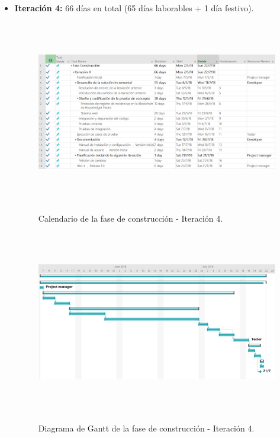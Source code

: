 \documentclass[12pt,a4paper, twoside]{report}
\begin{document}
\begin{itemize}
		\item \textbf{Iteración 4:} 66 días en total (65 días laborables + 1 día festivo).
		
		\begin{figure}[!ht]   
			\caption{Calendario de la fase de construcción - Iteración 4.} 
			\begin{center} 
		 		\includegraphics[width=16cm,height=8cm]{Images/planning/iterations/It4_calendar} \\
				\label{fig:planning-it4-calendar} 
			\end{center}  
		\end{figure}  
		
		\begin{figure}[!ht]   
			\caption{Diagrama de Gantt de la fase de construcción - Iteración 4.} 
			\begin{center} 
		 		\includegraphics[width=16cm,height=8cm]{Images/planning/iterations/It4_gantt} \\
				\label{fig:planning-it4-gantt} 
			\end{center}  
		\end{figure}  


\end{itemize}
\end{document}
